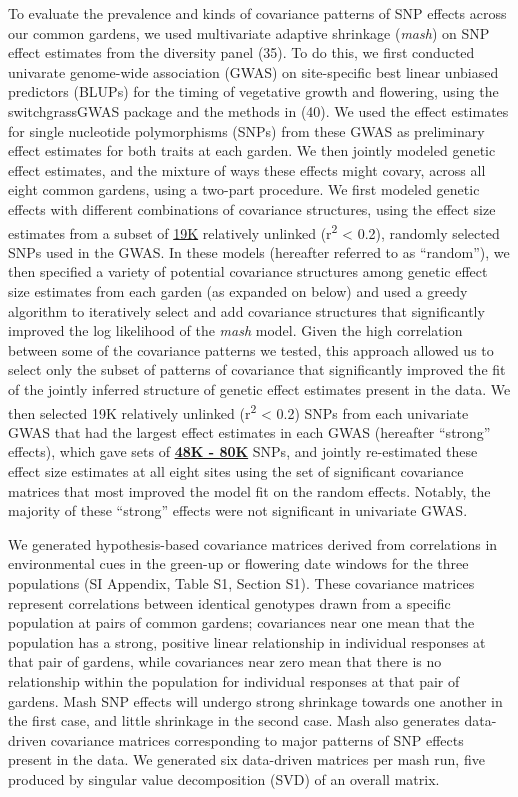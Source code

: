 \documentclass[
  9pt,
  twocolumn,
  twoside]{pnas-new}
\begin{document}
To evaluate the prevalence and kinds of covariance patterns of SNP
effects across our common gardens, we used multivariate adaptive
shrinkage (\emph{mash}) on SNP effect estimates from the diversity panel
(35). To do this, we first conducted univarate genome-wide association
(GWAS) on site-specific best linear unbiased predictors (BLUPs) for the
timing of vegetative growth and flowering, using the switchgrassGWAS
package and the methods in (40). We used the effect estimates for single
nucleotide polymorphisms (SNPs) from these GWAS as preliminary effect
estimates for both traits at each garden. We then jointly modeled
genetic effect estimates, and the mixture of ways these effects might
covary, across all eight common gardens, using a two-part procedure. We
first modeled genetic effects with different combinations of covariance
structures, using the effect size estimates from a subset of \ul{19K}
relatively unlinked (r\textsuperscript{2} \textless{} 0.2), randomly
selected SNPs used in the GWAS. In these models (hereafter referred to
as ``random''), we then specified a variety of potential covariance
structures among genetic effect size estimates from each garden (as
expanded on below) and used a greedy algorithm to iteratively select and
add covariance structures that significantly improved the log likelihood
of the \emph{mash} model. Given the high correlation between some of the
covariance patterns we tested, this approach allowed us to select only
the subset of patterns of covariance that significantly improved the fit
of the jointly inferred structure of genetic effect estimates present in
the data. We then selected 19K relatively unlinked (r\textsuperscript{2}
\textless{} 0.2) SNPs from each univariate GWAS that had the largest
effect estimates in each GWAS (hereafter ``strong'' effects), which gave
sets of \ul{\textbf{48K - 80K}} SNPs, and jointly re-estimated these
effect size estimates at all eight sites using the set of significant
covariance matrices that most improved the model fit on the random
effects. Notably, the majority of these ``strong'' effects were not
significant in univariate GWAS.

We generated hypothesis-based covariance matrices derived from
correlations in environmental cues in the green-up or flowering date
windows for the three populations (SI Appendix, Table S1, Section S1).
These covariance matrices represent correlations between identical
genotypes drawn from a specific population at pairs of common gardens;
covariances near one mean that the population has a strong, positive
linear relationship in individual responses at that pair of gardens,
while covariances near zero mean that there is no relationship within
the population for individual responses at that pair of gardens. Mash
SNP effects will undergo strong shrinkage towards one another in the
first case, and little shrinkage in the second case. Mash also generates
data-driven covariance matrices corresponding to major patterns of SNP
effects present in the data. We generated six data-driven matrices per
mash run, five produced by singular value decomposition (SVD) of an
overall matrix.
\end{document}
